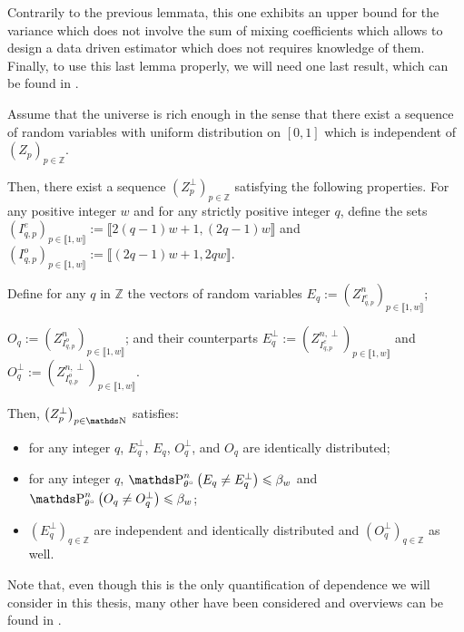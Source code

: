 Contrarily to the previous lemmata, this one exhibits an upper bound for the variance which does not involve the sum of mixing coefficients which allows to design a data driven estimator which does not requires knowledge of them.
Finally, to use this last lemma properly, we will need one last result, which can be found in .
\begin{lm}\label{AS_DEPENDENTDATA_RICHSPACE}
Assume that the universe is rich enough in the sense that there exist a sequence of random variables with uniform distribution on $[0,1]$ which is independent of $(Z_{p})_{p \in \mathds{Z}}$.

Then, there exist a sequence $(Z_{p}^{\perp})_{p \in \mathds{Z}}$ satisfying the following properties.
For any positive integer $w$ and for any strictly positive integer $q$, define the sets $(I_{q, p}^{e})_{p \in \llbracket 1, w\rrbracket} := \llbracket 2(q-1) w + 1, (2q - 1) w\rrbracket$ and $\left(I_{q, p}^{o}\right)_{p \in \llbracket 1, w \rrbracket} := \llbracket (2q-1) w + 1, 2q w\rrbracket$.

Define for any $q$ in $\mathds{Z}$ the vectors of random variables $E_{q} := (Z_{I_{q, p}^{e}}^{n})_{p \in \llbracket 1, w \rrbracket}$;

$O_{q} := (Z_{I_{q, p}^{o}}^{n})_{p \in \llbracket 1, w \rrbracket}$; and their counterparts $E_{q}^{\perp} := (Z_{I_{q, p}^{e}}^{n, \perp})_{p \in \llbracket 1, w \rrbracket}$ and $O_{q}^{\perp} := (Z_{I_{q, p}^{o}}^{n, \perp})_{p \in \llbracket 1, w \rrbracket}$.

Then, $\left(Z^{\perp}_{p}\right)_{p \in \N}$ satisfies:
\begin{itemize}
\item for any integer $q$, $E^{\perp}_{q}$, $E_{q}$, $O^{\perp}_{q}$, and $O_{q}$ are identically distributed;
\item for any integer $q$, $\P_{\theta^{\circ}}^{n}\left(E_{q} \neq E^{\perp}_{q}\right) \leq \beta_{w}$ and $\P_{\theta^{\circ}}^{n}\left(O_{q} \neq O^{\perp}_{q}\right) \leq \beta_{w}$;
\item $\left(E^{\perp}_{q}\right)_{q \in \mathds{Z}}$ are independent and identically distributed and $\left(O^{\perp}_{q}\right)_{q \in \mathds{Z}}$ as well.
\end{itemize}
\reEnd
\end{lm}
Note that, even though this is the only quantification of dependence we will consider in this thesis, many other have been considered and overviews can be found in .

